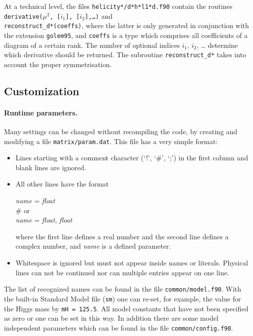 \documentclass[11pt,a4paper]{refrep}
\begin{document}
At a technical level, 
the files \texttt{helicity*/d*h*l1*d.f90} contain the routines
\texttt{derivative($\mu^2$, [$i_1$], [$i_2$],\dots)} and\\
\texttt{reconstruct\_d*(coeffs)}, where the latter is only generated in
conjunction with the extension \texttt{golem95}, and \texttt{coeffs} is
a type which comprises all coefficients of a diagram of a certain rank.
The number of optional indices $i_1$, $i_2$, \dots 
determine which derivative should be returned. The subroutine
\texttt{reconstruct\_d*} takes into account the proper symmetrisation.

\subsection{Customization}
\paragraph{Runtime parameters.}
Many settings can be changed without recompiling the code, by
creating and modifying a file \texttt{matrix/param.dat}.
This file has a very simple format:
\begin{itemize}
\item Lines starting with a comment character (`!', `\#', `;')
      in the first column and blank lines are ignored.
\item All other lines have the format
\begin{example}
\textit{name} = \textit{float}\\
\# \textrm{or}\\
\textit{name} = \textit{float}, \textit{float}
\end{example}
      where the first line defines a real number and the second
      line defines a complex number, and \textit{name} is a defined
      parameter.
\item Whitespace is ignored but must not appear inside names or
      literals. Physical lines can not be continued nor can
      multiple entries appear on one line.
\end{itemize}
The list of recognized names can be found in the file
\texttt{common/model.f90}. 
With the built-in Standard Model file (\texttt{sm}) one
can re-set, for example, the value for the Higgs mass by 
{\tt mH = 125.5}.
All model constants that have not been specified as zero or one
can be set in this way. 
In addition there are some model independent parameters which can be found in the file 
\texttt{common/config.f90}.
\end{document}
